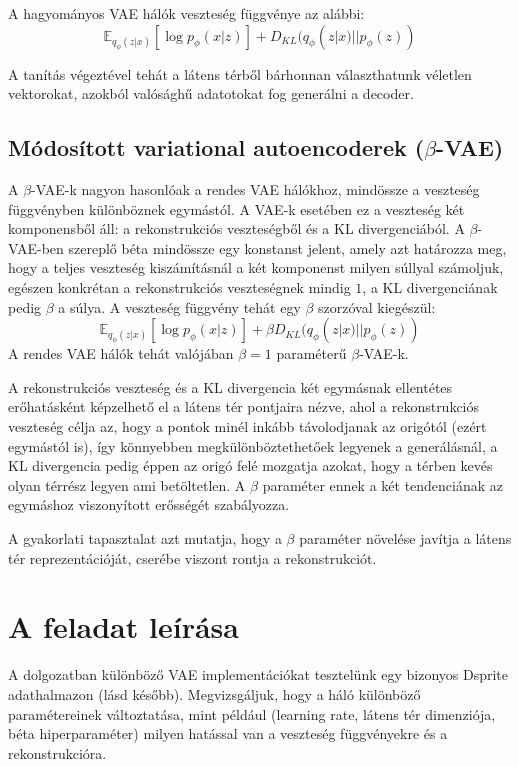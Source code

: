 A hagyományos VAE hálók veszteség függvénye az alábbi:
$$ \mathbb{E}_{q_\phi(z|x)} [\log p_\phi(x|z)] + D_{KL}(q_\phi(z|x)||p_\phi(z))$$

A tanítás végeztével tehát a látens térből bárhonnan választhatunk véletlen vektorokat, azokból valósághű adatotokat fog generálni a decoder.

\section{Módosított variational autoencoderek ($\beta$-VAE)}

A $\beta$-VAE-k nagyon hasonlóak a rendes VAE hálókhoz, mindössze a veszteség függvényben különböznek egymástól. A VAE-k esetében ez a veszteség két komponensből áll: a rekonstrukciós veszteségből és a KL divergenciából. A $\beta$-VAE-ben szereplő béta mindössze egy konstanst jelent, amely azt határozza meg, hogy a teljes veszteség kiszámításnál a két komponenst milyen súllyal számoljuk, egészen konkrétan a rekonstrukciós veszteségnek mindig $1$, a KL divergenciának pedig $\beta$ a súlya. A veszteség függvény tehát egy $\beta$ szorzóval kiegészül:
$$ \mathbb{E}_{q_\phi(z|x)} [\log p_\phi(x|z)] + \beta D_{KL}(q_\phi(z|x)||p_\phi(z))$$
A rendes VAE hálók tehát valójában $\beta=1$ paraméterű $\beta$-VAE-k.

A rekonstrukciós veszteség és a KL divergencia két egymásnak ellentétes erőhatásként képzelhető el a látens tér pontjaira nézve, ahol a rekonstrukciós veszteség célja az, hogy a pontok minél inkább távolodjanak az origótól (ezért egymástól is), így könnyebben megkülönböztethetőek legyenek a generálásnál, a KL divergencia pedig éppen az origó felé mozgatja azokat, hogy a térben kevés olyan térrész legyen ami betöltetlen. A $\beta$ paraméter ennek a két tendenciának az egymáshoz viszonyított erősségét szabályozza.

A gyakorlati tapasztalat azt mutatja, hogy a $\beta$ paraméter növelése javítja a látens tér reprezentációját, cserébe viszont rontja a rekonstrukciót.

\chapter{A feladat leírása}

A dolgozatban különböző VAE implementációkat tesztelünk egy bizonyos Dsprite adathalmazon (lásd később). Megvizsgáljuk, hogy a háló különböző paramétereinek változtatása, mint például (learning rate, látens tér dimenziója, béta hiperparaméter) milyen hatással van a veszteség függvényekre és a rekonstrukcióra.

